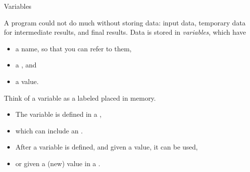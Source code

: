 \begin{comment}
\begin{exercise}
  \label{ex:cout-what}
  Experiment with the \lstinline{cout} statement. Replace the string by a
  number or a mathematical expression. Can you guess how to print more
  than one thing, for instance:
  \begin{itemize}
  \item the string \n{One third is}, and
  \item the result of the computation~$1/3$,     
  \end{itemize}
  with the same \lstinline{cout} statement?
\end{exercise}

\begin{block}{Return statement}
  \begin{itemize}
  \item The language standard says that \lstinline{main} has to be of type
    \lstinline{int}; the \indextermbus{return}{statement} returns an int.
  \item Compilers are fairly tolerant of deviations from this.
  \item Usual interpretation: returning zero means success; anything else failure;
  \item This \indextermbus{return}{code} can be detected by the
    \emph{shell}\index{shell!inspect return code}
  \end{itemize}
  \snippetwithoutput{returnone}{basic}{return}
\end{block}

\end{comment}

 {Variables}
\label{sec:variables}

A program could not do much without storing data: input data,
temporary data for intermediate results, and final results.
Data is stored in \emph{variables},  which have
\begin{itemize}
\item a name, so that you can refer to them,
\item a , and
\item a value.
\end{itemize}
Think of a variable as a labeled placed in memory.
\begin{itemize}
\item The variable is defined in a
  ,
\item which can include an .
\item After a variable is defined, and given a value, it can be used,
\item or given a (new) value in a .
\end{itemize}

